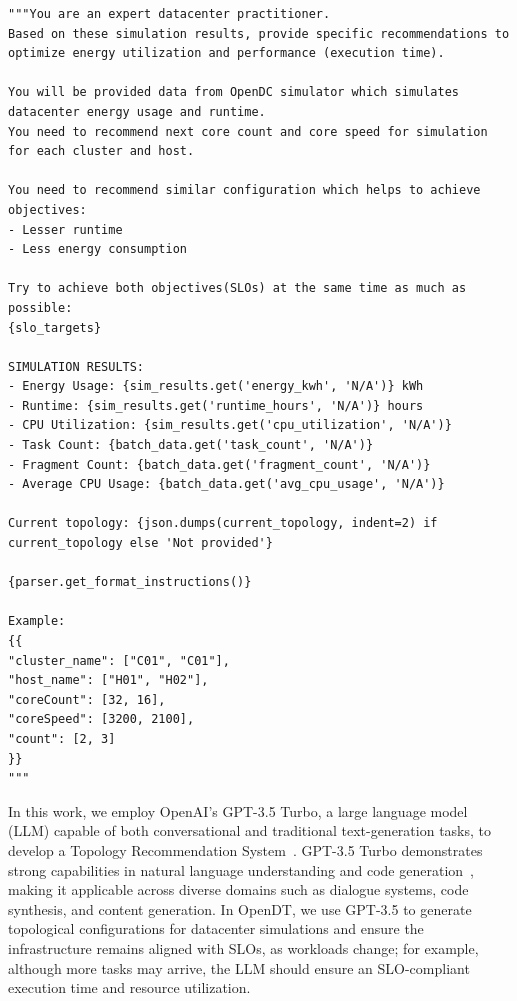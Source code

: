 \begin{lstlisting}[style=pyopendt,
  caption={OpenDT LLM prompt to request SLO-aligned topology changes.},
  label={lst:opendt-prompt},
  captionpos=b, % put caption below
  float=!htbp  % let it float like figures
]
"""You are an expert datacenter practitioner. 
Based on these simulation results, provide specific recommendations to optimize energy utilization and performance (execution time).

You will be provided data from OpenDC simulator which simulates datacenter energy usage and runtime.
You need to recommend next core count and core speed for simulation for each cluster and host.

You need to recommend similar configuration which helps to achieve objectives:
- Lesser runtime
- Less energy consumption

Try to achieve both objectives(SLOs) at the same time as much as possible:
{slo_targets}

SIMULATION RESULTS:
- Energy Usage: {sim_results.get('energy_kwh', 'N/A')} kWh
- Runtime: {sim_results.get('runtime_hours', 'N/A')} hours
- CPU Utilization: {sim_results.get('cpu_utilization', 'N/A')}
- Task Count: {batch_data.get('task_count', 'N/A')}  
- Fragment Count: {batch_data.get('fragment_count', 'N/A')}
- Average CPU Usage: {batch_data.get('avg_cpu_usage', 'N/A')}

Current topology: {json.dumps(current_topology, indent=2) if current_topology else 'Not provided'}

{parser.get_format_instructions()}

Example:
{{
"cluster_name": ["C01", "C01"],
"host_name": ["H01", "H02"],
"coreCount": [32, 16],
"coreSpeed": [3200, 2100],
"count": [2, 3]
}}
"""
\end{lstlisting}

In this work, we employ OpenAI’s GPT-3.5 Turbo, a large language model (LLM) capable of both conversational and traditional text-generation tasks, to develop a Topology Recommendation System~. 
GPT-3.5 Turbo demonstrates strong capabilities in natural language understanding and code generation~, making it applicable across diverse domains such as dialogue systems, code synthesis, and content generation. 
In OpenDT, we use GPT-3.5 to generate topological configurations for datacenter simulations and ensure the infrastructure remains aligned with SLOs, as workloads change; 
for example, although more tasks may arrive, the LLM should ensure an SLO-compliant execution time and resource utilization.


